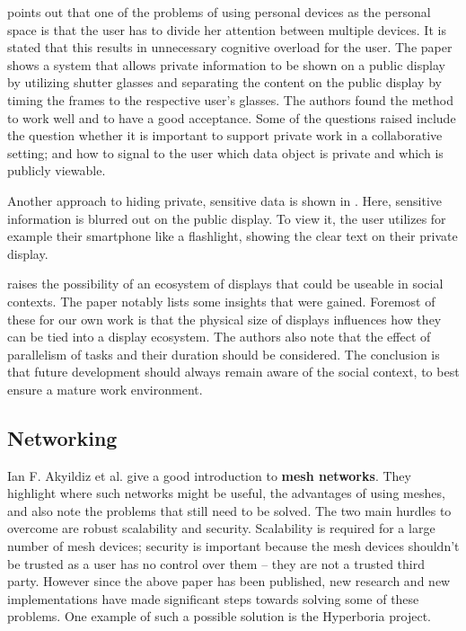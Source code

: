 \cite{shoemaker2001single} points out that one of the problems of using personal devices as the personal space is that the user has to divide her attention between multiple devices.
It is stated that this results in unnecessary cognitive overload for the user.
The paper shows a system that allows private information to be shown on a public display by utilizing shutter glasses and separating the content on the public display by timing the frames to the respective user's glasses.
The authors found the method to work well and to have a good acceptance.
Some of the questions raised include the question whether it is important to support private work in a collaborative setting; and how to signal to the user which data object is private and which is publicly viewable.

Another approach to hiding private, sensitive data is shown in \cite{1392750}.
Here, sensitive information is blurred out on the public display.
To view it, the user utilizes for example their smartphone like a flashlight, showing the clear text on their private display.

\cite{terrenghi2009taxonomy} raises the possibility of an ecosystem of displays that could be useable in social contexts.
The paper notably lists some insights that were gained.
Foremost of these for our own work is that the physical size of displays influences how they can be tied into a display ecosystem.
The authors also note that the effect of parallelism of tasks and their duration should be considered.
The conclusion is that future development should always remain aware of the social context, to best ensure a mature work environment.

\subsection{Networking}

Ian F. Akyildiz et al. \cite{akyildiz2005survey} give a good introduction to \textbf{mesh networks}.
They highlight where such networks might be useful, the advantages of using meshes, and also note the problems that still need to be solved.
The two main hurdles to overcome are robust scalability and security.
Scalability is required for a large number of mesh devices; security is important because the mesh devices shouldn't be trusted as a user has no control over them – they are not a trusted third party.
However since the above paper has been published, new research and new implementations have made significant steps towards solving some of these problems.
One example of such a possible solution is the Hyperboria \cite{hyperboria} project.

